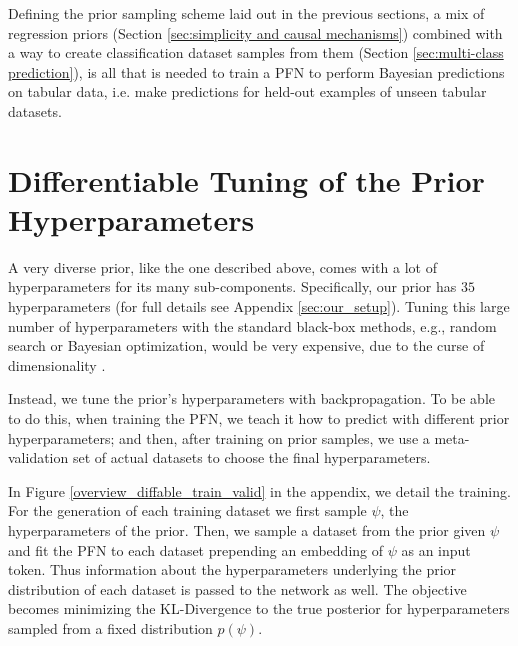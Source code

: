 \documentclass{article}
\begin{document}
Defining the prior sampling scheme laid out in the previous sections, a mix of regression priors (Section \ref{sec:simplicity and causal mechanisms}) combined with a way to create classification dataset samples from them (Section \ref{sec:multi-class prediction}), is all that is needed to train a PFN to perform Bayesian predictions on tabular data, i.e. make predictions for held-out examples of unseen tabular datasets.

\iffalse
\section{Differentiable Tuning of the Prior Hyperparameters} %
\label{sec:differentiable hyperparameter tuning}
%


A very diverse prior, like the one described above, comes with a lot of hyperparameters for its many sub-components. Specifically, our prior has $35$ hyperparameters (for full details see Appendix \ref{sec:our_setup}).
Tuning this large number of hyperparameters with the standard black-box methods, e.g., random search or Bayesian optimization, would be very expensive, due to the curse of dimensionality \citep{maclaurin-icml15a}.


Instead, we tune the prior's hyperparameters with backpropagation. To be able to do this, when training the PFN, we teach it how to predict with different prior hyperparameters; and then, after training on prior samples, we use a meta-validation set of actual datasets to choose the final hyperparameters.

In Figure \ref{overview_diffable_train_valid} in the appendix, we detail the training. For the generation of each training dataset we first sample $\psi$, the hyperparameters of the prior.
Then, we sample a dataset from the prior given $\psi$ and fit the PFN to each dataset prepending an embedding of $\psi$ as an input token. Thus information about the hyperparameters underlying the prior distribution of each dataset is passed to the network as well.
The objective becomes minimizing the KL-Divergence to the true posterior for hyperparameters sampled from a fixed distribution $p(\psi)$.
\end{document}
